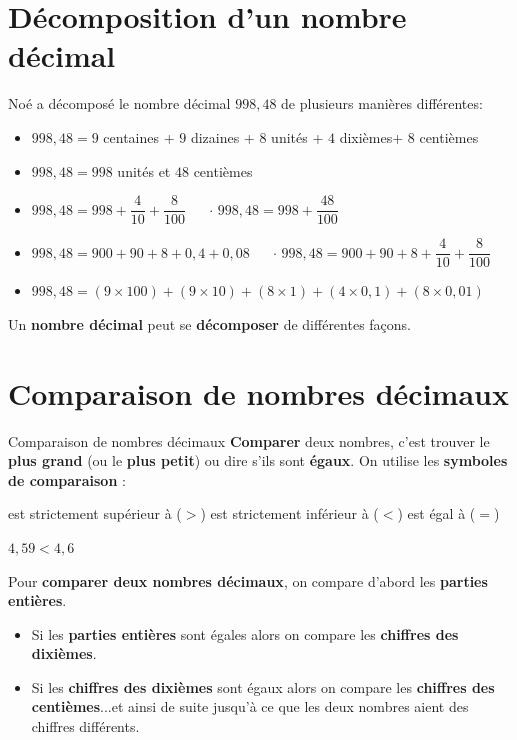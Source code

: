 \begin{pageCours} 

\section{Décomposition d'un nombre décimal}

\begin{Ex}
Noé a décomposé le nombre décimal $998,48$ de plusieurs manières différentes:
\begin{itemize}[leftmargin=*]
\item $998,48=9$ centaines + $9$ dizaines + $8$ unités + $4$ dixièmes+ $8$ centièmes
\item $998,48=998$ unités et $48$ centièmes 
\item $998,48=998+\dfrac{4}{10}+\dfrac{8}{100}$ $\quad$ $\cdot$ $998,48=998+\dfrac{48}{100}$
\item $998,48=900+90+8+0,4+0,08$ $\quad$ $\cdot$ $998,48=900+90+8+\dfrac{4}{10}+\dfrac{8}{100}$
\item $998,48=(9\times100)+(9\times10)+(8\times1)+(4\times0,1)+(8\times0,01)$
\end{itemize}
\end{Ex}

\begin{Prop}
Un \textbf{nombre décimal} peut se \textbf{décomposer} de différentes façons.
\end{Prop}


\section{Comparaison de nombres décimaux}

\begin{DefT}{Comparaison de nombres décimaux}  
\textbf{Comparer} deux nombres, c'est trouver le \textbf{plus grand} (ou le \textbf{plus petit}) ou dire s'ils sont \textbf{égaux}.
On utilise les \textbf{symboles de comparaison} : 

est strictement supérieur à ($>$) \hspace{0.3cm} est strictement inférieur à ($<$) \hspace{0.3cm} est égal à ($=$)
\end{DefT}

\begin{Ex}
$4,59 < 4,6$
\end{Ex} 

\begin{Mt}
Pour \textbf{comparer deux nombres décimaux}, on compare d'abord les \textbf{parties entières}.
\begin{itemize}[leftmargin=*]
\item Si les \textbf{parties entières} sont égales alors on compare les \textbf{chiffres des dixièmes}.
\item Si les \textbf{chiffres des dixièmes} sont égaux alors on compare les \textbf{chiffres des centièmes}...et ainsi de suite jusqu'à ce que les deux nombres aient des chiffres différents.
\end{itemize}
\end{Mt}


\end{pageCours} 

